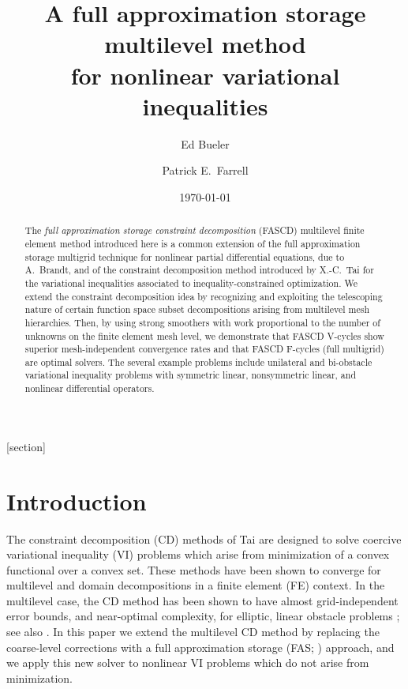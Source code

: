 \documentclass[letterpaper,final,12pt,reqno]{amsart}
\theoremstyle{cstyle}
\theoremstyle{cstyle*}
\theoremstyle{dstyle}
\numberwithin{equation}{section}
\numberwithin{figure}{section}
\numberwithin{table}{section}
\numberwithin{theorem}{section}
\begin{document}
\title[FAS for nonlinear variational inequalities]{A full approximation storage multilevel method \\ for nonlinear variational inequalities}

\author{Ed Bueler}

\author{Patrick E.~Farrell}

\date{\today}

\begin{abstract}
The \emph{full approximation storage constraint decomposition} (FASCD) multilevel finite element method introduced here is a common extension of the full approximation storage multigrid technique for nonlinear partial differential equations, due to A.~Brandt, and of the constraint decomposition method introduced by X.-C.~Tai for the variational inequalities associated to inequality-constrained optimization.  We extend the constraint decomposition idea by recognizing and exploiting the telescoping nature of certain function space subset decompositions arising from multilevel mesh hierarchies.  Then, by using strong smoothers with work proportional to the number of unknowns on the finite element mesh level, we demonstrate that FASCD V-cycles show superior mesh-independent convergence rates and that FASCD F-cycles (full multigrid) are optimal solvers.  The several example problems include unilateral and bi-obstacle variational inequality problems with symmetric linear, nonsymmetric linear, and nonlinear differential operators.
\end{abstract}

\maketitle


\thispagestyle{empty}

[section]


\section{Introduction} \label{sec:intro}

The constraint decomposition (CD) methods of Tai \cite{Tai2003} are designed to solve coercive variational inequality (VI) problems which arise from minimization of a convex functional over a convex set.  These methods have been shown to converge for multilevel and domain decompositions in a finite element (FE) context.  In the multilevel case, the CD method has been shown to have almost grid-independent error bounds, and near-optimal complexity, for elliptic, linear obstacle problems \cite[Subsection 5.4]{Tai2003}; see also \cite[Theorem 4.6 and Algorithm 4.7]{GraeserKornhuber2009}.  In this paper we extend the multilevel CD method by replacing the coarse-level corrections with a full approximation storage (FAS; \cite{Brandt1977,Bruneetal2015}) approach, and we apply this new solver to nonlinear VI problems which do not arise from minimization.
\end{document}
